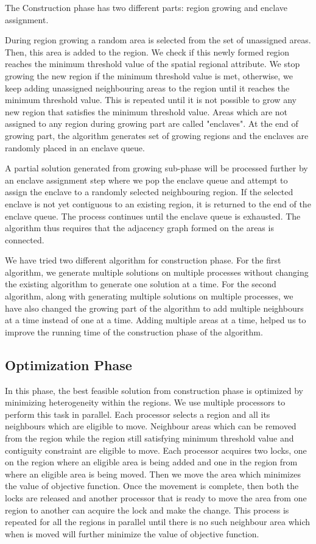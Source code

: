 \documentclass[conference]{IEEEtran}
\begin{document}
The Construction phase has two different parts: region growing and enclave
assignment.

During region growing a random area is selected from the set of unassigned
areas. Then, this area is added to the region. We check if this newly
formed region reaches the minimum threshold value of the spatial regional attribute.
We stop growing the new region if the minimum threshold value is met, otherwise, we
keep adding unassigned neighbouring areas to the region until it reaches the
minimum threshold value. This is repeated until it is not possible to grow any
new region that satisfies the minimum threshold value. Areas which are not assigned
to any region during growing part are called "enclaves". At the end of growing
part, the algorithm generates set of growing regions and the enclaves are
randomly placed in an enclave queue.

A partial solution generated from growing sub-phase will be processed further by
an enclave assignment step where we pop the enclave queue and attempt to assign
the enclave to a randomly selected neighbouring region. If the selected enclave
is not yet contiguous to an existing region, it is returned to the end of the enclave
queue. The process continues until the enclave queue is exhausted. The algorithm
thus requires that the adjacency graph formed on the areas is connected.

We have tried two different algorithm for construction phase. For the first algorithm, we generate multiple solutions on multiple processes without changing the existing algorithm to generate one solution at a time. For the second algorithm, along with generating multiple solutions on multiple processes, we have also changed the growing part of the algorithm to add multiple neighbours at a time instead of one at a time. Adding multiple areas at a time, helped us to improve the running time of the construction phase of the algorithm.

\subsection{Optimization Phase}
In this phase, the best feasible solution from construction phase is optimized
by minimizing heterogeneity within the regions. We use multiple processors to
perform this task in parallel. Each processor selects a region and all its
neighbours which are eligible to move. Neighbour areas which can be removed from
the region while the region still satisfying minimum threshold value and
contiguity constraint are eligible to move. Each processor acquires two locks,
one on the region where an eligible area is being added and one in the region from
where an eligible area is being moved. Then we move the area which minimizes the
value of objective function. Once the movement is complete, then both the locks
are released and another processor that is ready to move the area from one
region to another can acquire the lock and make the change. This process is
repeated for all the regions in parallel until there is no such neighbour area
which when is moved will further minimize the value of objective function.
\end{document}
